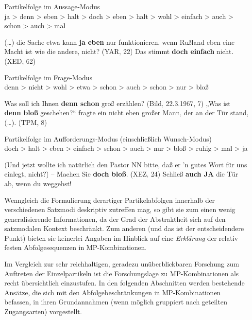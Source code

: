 \begin{exe}
	\ex\label{14} 
		Partikelfolge im Aussage-Modus \\
		ja > denn > eben > halt > doch > eben > halt > wohl > einfach > auch > schon > auch > mal 
	\begin{xlist}	
		\ex\label{14a}(\ldots) die Sache etwa kann \textbf{ja eben} nur funktionieren, wenn Rußland eben eine Macht ist wie die andere, nicht? (YAR, 22) 
		\ex\label{14b}Das stimmt \textbf{doch einfach} nicht. (XED, 62)
	\end{xlist}	
\end{exe}
\begin{exe}
	\ex\label{15} 
		Partikelfolge im Frage-Modus \\
		denn > nicht > wohl > etwa > schon > auch > schon > nur > bloß
	\begin{xlist}	
		\ex\label{15a} Was soll ich Ihnen \textbf{denn schon} groß erzählen? (Bild, 22.3.1967, 7)
		\ex\label{15b} „Was ist \textbf{denn bloß} geschehen?“ fragte ein nicht eben großer Mann, der an der Tür stand, (\ldots). (TPM, 8)	
	\end{xlist}	
\end{exe}
	 	
\begin{exe}
	\ex\label{16} 
		Partikelfolge im Aufforderungs-Modus (einschließlich Wunsch-Modus) \\
		doch > halt > eben > einfach > schon > auch > nur > bloß > ruhig > mal > ja	
	\begin{xlist}	
		\ex\label{16a} (Und jetzt wollte ich natürlich den Pastor NN bitte, daß er 'n gutes Wort für uns einlegt, nicht?) – 				Machen Sie \textbf{doch bloß}. (XEZ, 24)
		\ex\label{16b} Schließ \textbf{auch JA} die Tür ab, wenn du weggehst!
	\end{xlist}			
\hfill\hbox{\citet[1542/1543]{Zifonun1997}}
\end{exe}
Wenngleich die Formulierung derartiger Partikelabfolgen innerhalb der verschie\-denen Satzmodi deskriptiv zutreffen mag, so gibt sie zum einen wenig genera\-lisierende Informationen, da der Grad der Abstraktheit sich auf den satzmodalen Kontext beschränkt. Zum anderen (und das ist der entscheidendere Punkt) bieten sie keinerlei Angaben im Hinblick auf eine \emph{Erklärung} der relativ festen Abfolgesequenzen in MP-Kom\-bi\-na\-ti\-on\-en.

Im Vergleich zur sehr reichhaltigen, geradezu unüberblickbaren Forschung zum Auftreten der Einzelpartikeln ist die Forschungslage zu MP-Kom\-bi\-na\-ti\-on\-en als recht übersichtlich einzustufen. In den folgenden Abschnitten werden bestehende Ansätze, die sich mit den Abfolgebeschränkungen in MP-Kom\-bi\-na\-ti\-on\-en befassen, in ihren Grundannahmen (wenn möglich gruppiert nach geteilten Zugangsarten) vorgestellt.
	 														 
